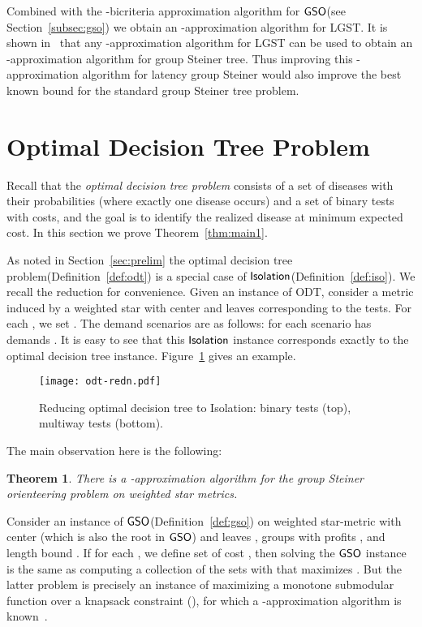 \documentclass[11pt]{article}
\newtheorem{theorem}[thm]{Theorem}
\def\odt{{\sf ODT}\xspace}
\def\isoprob{\ensuremath{{\sf Isolation}}\xspace}
\def\gso{\ensuremath{{\sf GSO}}\xspace}
\def\lgs{{\sf LGST}\xspace}
\def\dtp{optimal decision tree problem\xspace}
\newenvironment{pf}{

\noindent{\bf Proof:}} {\hfill


}
\begin{document}
Combined with the -bicriteria approximation algorithm for \gso (see Section~\ref{subsec:gso}) we obtain an -approximation algorithm for \lgs.  It is  shown in~\cite{Vish-thesis} that any -approximation algorithm for \lgs can be used to obtain an -approximation algorithm for group Steiner tree. Thus improving this
-approximation algorithm for latency group Steiner would also improve the best known bound for the standard group
Steiner tree problem.







\section{Optimal Decision Tree Problem}
\label{sec:odt}

Recall that  the \emph{\dtp} consists of  a set of diseases with their probabilities (where exactly one disease occurs) 
and a set of binary tests with costs, and the goal is to identify the realized disease at minimum expected cost. In this section we prove Theorem~\ref{thm:main1}.


As noted in Section~\ref{sec:prelim} the \dtp (Definition~\ref{def:odt})  is a special
  case of \isoprob (Definition~\ref{def:iso}). We recall the reduction for convenience. Given an instance of \odt, consider a metric  induced by a weighted star with
  center  and  leaves corresponding to the tests. For each , we set . The demand scenarios are as
  follows: for each  scenario  has demands .
  It is easy to see that this \isoprob instance corresponds
  exactly to the optimal decision tree instance. Figure~\ref{fig:odt-redn} gives an example.   



 
 
\begin{figure}[h]
\begin{center}
\texttt{[image: odt-redn.pdf]}
\end{center}
\caption{\label{fig:odt-redn} Reducing optimal decision tree to Isolation: binary tests (top), multiway tests
(bottom).}
\end{figure}



The main observation here is the following:  

\begin{theorem}
  \label{th:gso-stars} There is a -approximation algorithm for the group Steiner
  orienteering problem on weighted star metrics.
\end{theorem}
\begin{pf}
Consider an instance of \gso (Definition~\ref{def:gso}) on  weighted star-metric
   with center  (which is also the root in \gso) and leaves ,  groups  with profits , and length bound .
  If for each , we define set  of
  cost , then solving the \gso instance is the same
  as computing a collection  of the sets with  that maximizes . But the latter problem is precisely an instance of maximizing a monotone submodular
  function over a knapsack constraint (), for which a -approximation algorithm is
  known~\cite{s04}.
\end{pf}
\end{document}
